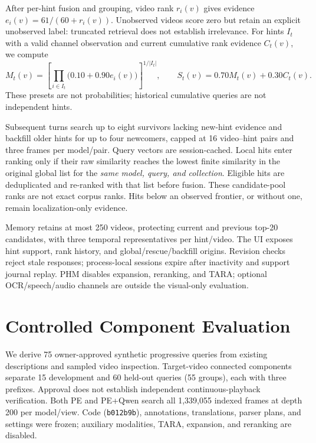 \documentclass[runningheads]{llncs}
\begin{document}
After per-hint fusion and grouping, video rank $r_i(v)$ gives evidence
$e_i(v)=61/(60+r_i(v))$. Unobserved videos score zero but retain an explicit
unobserved label: truncated retrieval does not establish irrelevance.
For hints $I_t$ with a valid channel observation and current cumulative rank
evidence $C_t(v)$, we compute
\begin{equation}
 M_t(v)=\left[\prod_{i\in I_t}\bigl(0.10+0.90e_i(v)\bigr)\right]^{1/|I_t|},
 \qquad S_t(v)=0.70M_t(v)+0.30C_t(v).
 \label{eq:phm}
\end{equation}
These presets are not probabilities; historical cumulative queries are not
independent hints.

Subsequent turns search up to eight survivors lacking new-hint evidence and
backfill older hints for up to four newcomers, capped at 16 video--hint pairs
and three frames per model/pair. Query vectors are session-cached. Local hits enter
ranking only if their raw similarity reaches the lowest finite similarity in
the original global list for the \emph{same model, query, and collection}.
Eligible hits are deduplicated and re-ranked with that list before fusion.
These candidate-pool ranks are not exact corpus ranks. Hits below an observed
frontier, or without one, remain localization-only evidence.

Memory retains at most 250 videos, protecting current and previous top-20
candidates, with three temporal representatives per hint/video. The UI exposes
hint support, rank history, and global/rescue/backfill origins. Revision checks
reject stale responses; process-local sessions expire after inactivity and support
journal replay. PHM disables expansion, reranking, and TARA; optional
OCR/speech/audio channels are outside the visual-only evaluation.

\section{Controlled Component Evaluation}
\label{sec:evaluation}
We derive 75 owner-approved synthetic progressive queries from existing
descriptions and sampled video inspection. Target-video connected components
separate 15 development and 60 held-out queries (55 groups), each with three
prefixes. Approval does not establish independent continuous-playback verification.
Both PE and PE+Qwen search all 1,339,055 indexed frames at depth 200 per model/view.
Code (\texttt{b012b9b}), annotations, translations, parser plans, and settings
were frozen; auxiliary modalities, TARA, expansion, and reranking are disabled.
\end{document}
